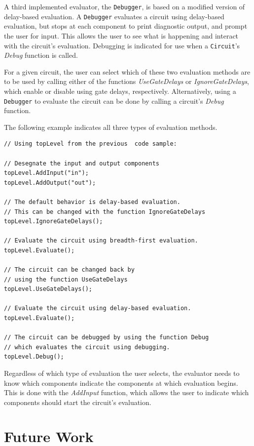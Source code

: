\documentclass{article}
\newcommand{\ClassName}[1]{\texttt{#1}}
\newcommand{\FunctionName}[1]{\textit{#1}}
\begin{document}
A third implemented evaluator, the \ClassName{Debugger}, is based on a modified version of delay-based evaluation. A \ClassName{Debugger} evaluates a circuit using delay-based evaluation, but stops at each component to print diagnostic output, and prompt the user for input. This allows the user to see what is happening and interact with the circuit’s evaluation. Debugging is indicated for use when a \ClassName{Circuit}'s \FunctionName{Debug} function is called.

For a given circuit, the user can select which of these two evaluation methods are to be used by calling either of the functions \FunctionName{UseGateDelays} or \FunctionName{IgnoreGateDelays}, which enable or disable using gate delays, respectively. Alternatively, using a \ClassName{Debugger} to evaluate the circuit can be done by calling a circuit's \FunctionName{Debug} function.

The following example indicates all three types of evaluation methods.

\begin{lstlisting}
// Using topLevel from the previous  code sample:

// Desegnate the input and output components
topLevel.AddInput("in");
topLevel.AddOutput("out");

// The default behavior is delay-based evaluation.
// This can be changed with the function IgnoreGateDelays
topLevel.IgnoreGateDelays();

// Evaluate the circuit using breadth-first evaluation.
topLevel.Evaluate();

// The circuit can be changed back by
// using the function UseGateDelays
topLevel.UseGateDelays();

// Evaluate the circuit using delay-based evaluation.
topLevel.Evaluate();

// The circuit can be debugged by using the function Debug
// which evaluates the circuit using debugging.
topLevel.Debug();
\end{lstlisting}

Regardless of which type of evaluation the user selects, the evaluator needs to know which components indicate the components at which evaluation begins. This is done with the \FunctionName{AddInput} function, which allows the user to indicate which components should start the circuit’s evaluation.

\section{Future Work}
\end{document}
